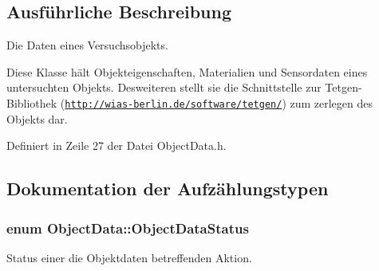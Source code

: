 \subsection{Ausführliche Beschreibung}
Die Daten eines Versuchsobjekts. 

Diese Klasse hält Objekteigenschaften, Materialien und Sensordaten eines untersuchten Objekts. Desweiteren stellt sie die Schnittstelle zur Tetgen-\/\-Bibliothek (\href{http://wias-berlin.de/software/tetgen/}{\tt http\-://wias-\/berlin.\-de/software/tetgen/}) zum zerlegen des Objekts dar. 

Definiert in Zeile 27 der Datei Object\-Data.\-h.



\subsection{Dokumentation der Aufzählungstypen}
\hypertarget{classObjectData_a20e8cd3cd0f8af3b571b9393aa9e6484}{
\subsubsection[{Object\-Data\-Status}]{\setlength{\rightskip}{0pt plus 5cm}enum {\bf Object\-Data\-::\-Object\-Data\-Status}}}\label{classObjectData_a20e8cd3cd0f8af3b571b9393aa9e6484}


Status einer die Objektdaten betreffenden Aktion. 

